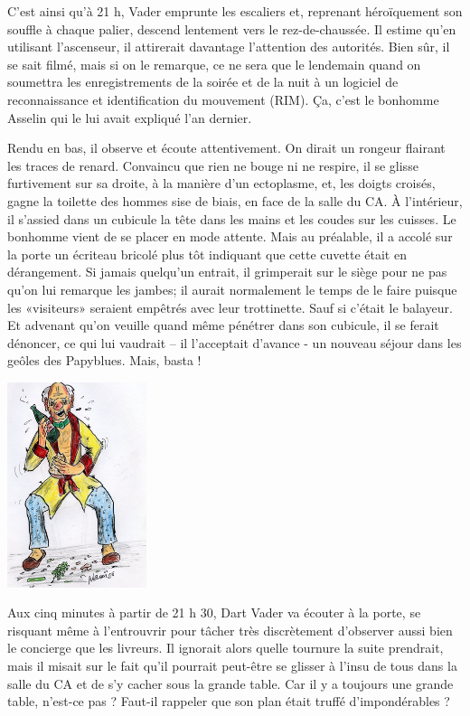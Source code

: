 C’est ainsi qu’à 21 h, Vader emprunte les escaliers et, reprenant héroïquement son souffle à chaque palier, descend lentement vers le rez-de-chaussée. Il estime qu’en utilisant l’ascenseur, il attirerait davantage l’attention des autorités. Bien sûr, il se sait filmé, mais si on le remarque, ce ne sera que le lendemain quand on soumettra les enregistrements de la soirée et de la nuit à un logiciel de reconnaissance et identification du mouvement (RIM). Ça, c’est le bonhomme Asselin qui le lui avait expliqué l’an dernier.

Rendu en bas, il observe et écoute attentivement. On dirait un rongeur flairant les traces de renard. Convaincu que rien ne bouge ni ne respire, il se glisse furtivement sur sa droite, à la manière d’un ectoplasme, et, les doigts croisés, gagne la toilette des hommes sise de biais, en face de la salle du CA. À l’intérieur, il s’assied dans un cubicule la tête dans les mains et les coudes sur les cuisses. Le bonhomme vient de se placer en mode attente. Mais au préalable, il a accolé sur la porte un écriteau bricolé plus tôt indiquant que cette cuvette était en dérangement. Si jamais quelqu’un entrait, il grimperait sur le siège pour ne pas qu’on lui remarque les jambes; il aurait normalement le temps de le faire puisque les «visiteurs» seraient empêtrés avec leur trottinette. Sauf si c’était le balayeur. Et advenant qu’on veuille quand même pénétrer dans son cubicule, il se ferait dénoncer, ce qui lui vaudrait – il l’acceptait d’avance - un nouveau séjour dans les geôles des Papyblues. Mais, basta ! 

\begin{floatingfigure}[l]{45mm}
\includegraphics[height=60mm]{corps/chapitre14/img/personnage-vader-bouffe.jpg}
\end{floatingfigure}

Aux cinq minutes à partir de 21 h 30, Dart Vader va écouter à la porte, se risquant même à l’entrouvrir pour tâcher très discrètement d’observer aussi bien le concierge que les livreurs. Il ignorait alors quelle tournure la suite prendrait, mais il misait sur le fait qu’il pourrait peut-être se glisser à l’insu de tous dans la salle du CA et de s’y cacher sous la grande table. Car il y a toujours une grande table, n’est-ce pas ? Faut-il rappeler que son plan était truffé d’impondérables ?

